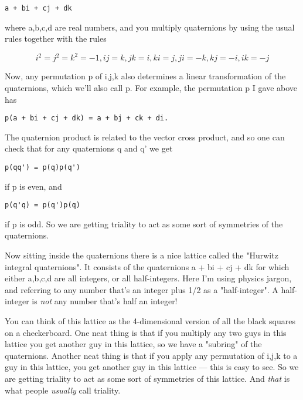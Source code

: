 \begin{verbatim}
a + bi + cj + dk
\end{verbatim}
    
where a,b,c,d are real numbers, and you multiply quaternions
by using the usual rules together with the rules

$$
i^{2} = j^{2} = k^{2} = -1, 
ij =  k, jk =  i, ki =  j,
ji = -k, kj = -i, ik = -j
$$
    
Now, any permutation p of {i,j,k} also determines a linear 
transformation of the quaternions, which we'll also call p.  
For example, the permutation p I gave above has

\begin{verbatim}
p(a + bi + cj + dk) = a + bj + ck + di.
\end{verbatim}
    
The quaternion product is related to the vector cross product,
and so one can check that for any quaternions q and q' we
get 

\begin{verbatim}
p(qq') = p(q)p(q')
\end{verbatim}
    
if p is even, and

\begin{verbatim}
p(q'q) = p(q')p(q)
\end{verbatim}
    
if p is odd.  So we are getting triality to act as some sort
of symmetries of the quaternions.  

Now sitting inside the quaternions there is a nice lattice 
called the "Hurwitz integral quaternions".  It consists of 
the quaternions a + bi + cj + dk for which either a,b,c,d are 
all integers, or all half-integers.  Here I'm using physics jargon, 
and referring to any number that's an integer plus 1/2 as a 
"half-integer".  A half-integer is \emph{not} 
any number that's half 
an integer!   

You can think of this lattice as the 4-dimensional
version of all the black squares on a checkerboard.  
One neat thing is that if you multiply any two guys in
this lattice you get another guy in this lattice, so we
have a "subring" of the quaternions.  Another neat thing is 
that if you apply any permutation of {i,j,k} to a guy in this 
lattice, you get another guy in this lattice --- this is easy
to see.   So we are getting triality to act as some sort
of symmetries of this lattice.  And \emph{that} is what people
\emph{usually} call triality.  

